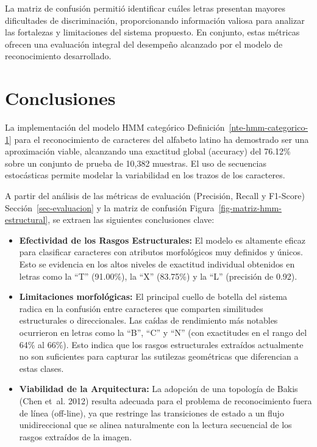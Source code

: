 \documentclass[
  spanish,
  us-letterpaper,
  DIV=11,
  numbers=noendperiod]{scrreprt}
\providecommand{\tightlist}{%
  \setlength{\itemsep}{0pt}\setlength{\parskip}{0pt}}
\begin{document}
La matriz de confusión permitió identificar cuáles letras presentan
mayores dificultades de discriminación, proporcionando información
valiosa para analizar las fortalezas y limitaciones del sistema
propuesto. En conjunto, estas métricas ofrecen una evaluación integral
del desempeño alcanzado por el modelo de reconocimiento desarrollado.


\chapter{Conclusiones}\label{conclusiones}

La implementación del modelo HMM categórico
Definición~\ref{nte-hmm-categorico-1} para el reconocimiento de
caracteres del alfabeto latino ha demostrado ser una aproximación
viable, alcanzando una exactitud global (accuracy) del 76.12\% sobre un
conjunto de prueba de 10,382 muestras. El uso de secuencias estocásticas
permite modelar la variabilidad en los trazos de los caracteres.

A partir del análisis de las métricas de evaluación (Precisión, Recall y
F1-Score) Sección~\ref{sec-evaluacion} y la matriz de confusión
Figura~\ref{fig-matriz-hmm-estructural}, se extraen las siguientes
conclusiones clave:

\begin{itemize}
\tightlist
\item
  \textbf{Efectividad de los Rasgos Estructurales:} El modelo es
  altamente eficaz para clasificar caracteres con atributos morfológicos
  muy definidos y únicos. Esto se evidencia en los altos niveles de
  exactitud individual obtenidos en letras como la ``T'' (91.00\%), la
  ``X'' (83.75\%) y la ``L'' (precisión de 0.92).
\item
  \textbf{Limitaciones morfológicas:} El principal cuello de botella del
  sistema radica en la confusión entre caracteres que comparten
  similitudes estructurales o direccionales. Las caídas de rendimiento
  más notables ocurrieron en letras como la ``B'', ``C'' y ``N'' (con
  exactitudes en el rango del 64\% al 66\%). Esto indica que los rasgos
  estructurales extraídos actualmente no son suficientes para capturar
  las sutilezas geométricas que diferencian a estas clases.
\item
  \textbf{Viabilidad de la Arquitectura:} La adopción de una topología
  de Bakis (Chen et~al. 2012) resulta adecuada para el problema de
  reconocimiento fuera de línea (off-line), ya que restringe las
  transiciones de estado a un flujo unidireccional que se alinea
  naturalmente con la lectura secuencial de los rasgos extraídos de la
  imagen.
\end{itemize}
\end{document}
